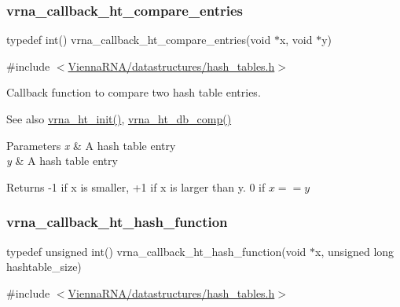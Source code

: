 \subsubsection{\texorpdfstring{vrna\+\_\+callback\+\_\+ht\+\_\+compare\+\_\+entries}{vrna\_callback\_ht\_compare\_entries}}
{\footnotesize\ttfamily typedef int() vrna\+\_\+callback\+\_\+ht\+\_\+compare\+\_\+entries(void $\ast$x, void $\ast$y)}



{\ttfamily \#include $<$\hyperlink{hash__tables_8h}{Vienna\+R\+N\+A/datastructures/hash\+\_\+tables.\+h}$>$}



Callback function to compare two hash table entries. 

\begin{DoxySeeAlso}{See also}
\hyperlink{group__hash__table__utils_ga37d1c7e13087a2b7c1b87fda34577c29}{vrna\+\_\+ht\+\_\+init()}, \hyperlink{group__hash__table__utils_gac4ec0b8372d50d7347a63f140f340962}{vrna\+\_\+ht\+\_\+db\+\_\+comp()} 
\end{DoxySeeAlso}

\begin{DoxyParams}{Parameters}
{\em x} & A hash table entry \\
\hline
{\em y} & A hash table entry \\
\hline
\end{DoxyParams}
\begin{DoxyReturn}{Returns}
-\/1 if x is smaller, +1 if x is larger than y. 0 if $x == y $ 
\end{DoxyReturn}
\mbox{\label{group__hash__table__utils_ga8533dc0cb44035d5fdb05e3c28922d2b}} 
\subsubsection{\texorpdfstring{vrna\+\_\+callback\+\_\+ht\+\_\+hash\+\_\+function}{vrna\_callback\_ht\_hash\_function}}
{\footnotesize\ttfamily typedef unsigned int() vrna\+\_\+callback\+\_\+ht\+\_\+hash\+\_\+function(void $\ast$x, unsigned long hashtable\+\_\+size)}



{\ttfamily \#include $<$\hyperlink{hash__tables_8h}{Vienna\+R\+N\+A/datastructures/hash\+\_\+tables.\+h}$>$}



